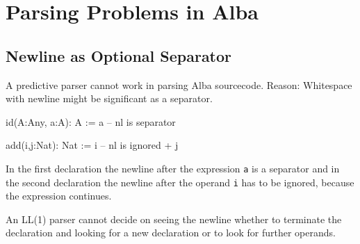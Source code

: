 \section{Parsing Problems in Alba}

\subsection{Newline as Optional Separator}

A predictive parser cannot work in parsing Alba sourcecode. Reason: Whitespace
with newline might be significant as a separator.

\begin{alba}
  id(A:Any, a:A): A :=
    a        -- nl is separator

  add(i,j:Nat): Nat :=
    i        -- nl is ignored
    + j
\end{alba}
%
In the first declaration the newline after the expression \verb!a! is a
separator and in the second declaration the newline after the operand \verb!i!
has to be ignored, because the expression continues.

An LL(1) parser cannot decide on seeing the newline whether to terminate the
declaration and looking for a new declaration or to look for further operands.


